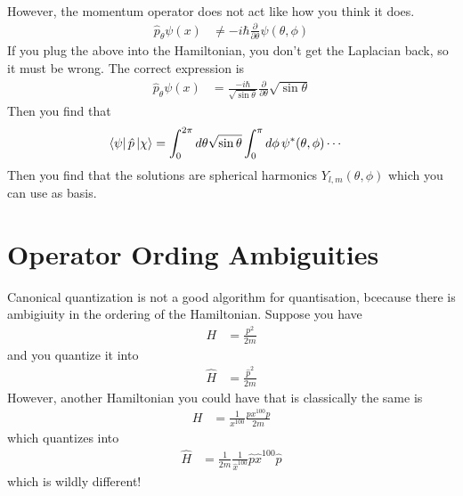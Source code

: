\begin{example}
\begin{align}
    \end{align}
    However, the momentum operator does not act like how you think it does.
    \begin{align}
        \hat{p}_\theta \psi(x) &\ne
        -i\hbar \frac{\partial}{\partial\theta} \psi(\theta,\phi)
    \end{align}
    If you plug the above into the Hamiltonian,
    you don't get the Laplacian back, so it must be wrong.
    The correct expression is
    \begin{align}
        \hat{p}_\theta \psi(x) &=
        \frac{-i\hbar}{\sqrt{\sin\theta}}
        \frac{\partial}{\partial\theta}\sqrt{\sin\theta}
    \end{align}
    Then you find that
    \begin{align}
        \bra{\psi}\hat{p}\ket{\chi}
        &=
        \int_{0}^{2\pi} d\theta \sqrt{\sin\theta}
        \int_{0}^{\pi}d\phi\,
        \psi^*(\theta,\phi)\cdots
    \end{align}
    Then you find that
    the solutions are spherical harmonics $Y_{l,m}(\theta,\phi)$
    which you can use as basis.
\end{example}

\section{Operator Ording Ambiguities}
Canonical quantization is not a good algorithm for quantisation,
bcecause there is ambigiuity in the ordering of the Hamiltonian.
Suppose you have
\begin{align}
    H &= \frac{p^2}{2m}
\end{align}
and you quantize it into
\begin{align}
    \hat{H} &= \frac{\hat{p}^2}{2m}
\end{align}
However, another Hamiltonian you could have that is classically the same is
\begin{align}
    H &=
    \frac{1}{x^{100}}
    \frac{p x^{100} p}{2m}
\end{align}
which quantizes into
\begin{align}
    \hat{H} &= \frac{1}{2m}
    \frac{1}{\hat{x}^{100}}
    \hat{p} \hat{x}^{100} \hat{p}
\end{align}
which is wildly different!

